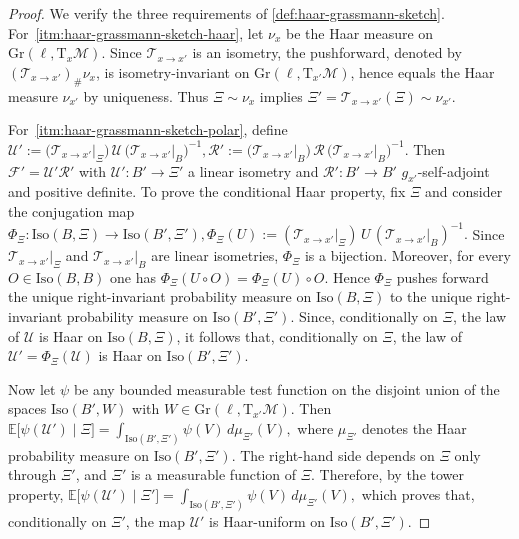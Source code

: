 \documentclass[final,onefignum,onetabnum]{siamart250211}
\begin{document}
 \begin{proof}

 We verify the three requirements of \cref{def:haar-grassmann-sketch}.
 For~\ref{itm:haar-grassmann-sketch-haar}, let $\nu_x$ be the Haar measure on $\mathrm{Gr}(\ell,\mathrm T_x\mathcal M)$.
 Since $\mathcal T_{x\to x'}$ is an isometry, the pushforward, denoted by $(\mathcal T_{x\to x'})_{\#}\nu_x$, is isometry-invariant on $\mathrm{Gr}(\ell,\mathrm T_{x'}\mathcal M)$, hence equals the Haar measure $\nu_{x'}$ by uniqueness.
 Thus $\Xi\sim\nu_x$ implies $\Xi'=\mathcal T_{x\to x'}(\Xi)\sim\nu_{x'}$.

For~\ref{itm:haar-grassmann-sketch-polar},  define
$
\mathcal U'
:= \bigl(\mathcal T_{x\to x'}\vert_{\Xi}\bigr)\,\mathcal U\,\bigl(\mathcal T_{x\to x'}\vert_{B}\bigr)^{-1},
\mathcal R'
:= \bigl(\mathcal T_{x\to x'}\vert_{B}\bigr)\,\mathcal R\,\bigl(\mathcal T_{x\to x'}\vert_{B}\bigr)^{-1}.
$
Then $\mathcal F'=\mathcal U'\mathcal R'$ with $\mathcal U':B'\to\Xi'$ a linear isometry and $\mathcal R':B'\to B'$ $g_{x'}$-self-adjoint and positive definite.
To prove the conditional Haar property, fix $\Xi$ and consider the conjugation map
$
\Phi_{\Xi}:\mathrm{Iso}(B,\Xi)\to \mathrm{Iso}(B',\Xi'),
\Phi_{\Xi}(U):=(\mathcal T_{x\to x'}\vert_{\Xi})\,U\,(\mathcal T_{x\to x'}\vert_{B})^{-1}.
$
Since $\mathcal T_{x\to x'}\vert_{\Xi}$ and $\mathcal T_{x\to x'}\vert_{B}$ are linear isometries, $\Phi_{\Xi}$ is a bijection. Moreover, for every $O\in\mathrm{Iso}(B,B)$ one has
$\Phi_{\Xi}(U\circ O)=\Phi_{\Xi}(U)\circ O$.
Hence $\Phi_{\Xi}$ pushes forward the unique right-invariant probability measure on $\mathrm{Iso}(B,\Xi)$ to the unique right-invariant probability measure on $\mathrm{Iso}(B',\Xi')$.
Since, conditionally on $\Xi$, the law of $\mathcal U$ is Haar on $\mathrm{Iso}(B,\Xi)$, it follows that, conditionally on $\Xi$, the law of $\mathcal U'=\Phi_{\Xi}(\mathcal U)$ is Haar on $\mathrm{Iso}(B',\Xi')$.

Now let $\psi$ be any bounded measurable test function on the disjoint union of the spaces $\mathrm{Iso}(B',W)$ with $W\in\mathrm{Gr}(\ell,\mathrm T_{x'}\mathcal M)$. Then
$
\mathbb E\big[\psi(\mathcal U')\mid \Xi\big]
=\int_{\mathrm{Iso}(B',\Xi')}\psi(V)\,d\mu_{\Xi'}(V),
$
where $\mu_{\Xi'}$ denotes the Haar probability measure on $\mathrm{Iso}(B',\Xi')$.
The right-hand side depends on $\Xi$ only through $\Xi'$, and $\Xi'$ is a measurable function of $\Xi$.
Therefore, by the tower property,
$
\mathbb E\big[\psi(\mathcal U')\mid \Xi'\big]
=\int_{\mathrm{Iso}(B',\Xi')}\psi(V)\,d\mu_{\Xi'}(V),
$
which proves that, conditionally on $\Xi'$, the map $\mathcal U'$ is Haar-uniform on $\mathrm{Iso}(B',\Xi')$.


\end{proof}
\end{document}
